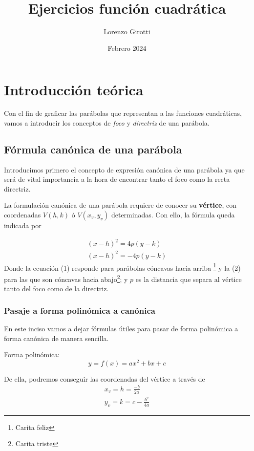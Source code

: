\documentclass{article}
\title{Ejercicios función cuadrática}
\author{Lorenzo Girotti }
\date{Febrero 2024}
\begin{document}
\maketitle

\section{Introducción teórica}
Con el fin de graficar las parábolas que representan a las funciones cuadráticas, vamos a introducir los conceptos de \emph{foco} y \emph{directriz} de una parábola.

\subsection{Fórmula canónica de una parábola}

Introducimos primero el concepto de expresión canónica de una parábola ya que será de vital importancia a la hora de encontrar tanto el foco como la recta directriz.

La formulación canónica de una parábola requiere de conocer su \textbf{vértice}, con coordenadas $V(h,k)$ ó $V(x_v,y_v)$ determinadas. Con ello, la fórmula queda indicada por

\begin{gather}
    \label{eq:form-canon}
    (x-h)^2=4p(y-k)\\
    (x-h)^2=-4p(y-k)
\end{gather}
Donde la ecuación (1) responde para parábolas cóncavas hacia arriba \footnote{Carita feliz} y la (2) para las que son cóncavas hacia abajo\footnote{Carita triste}; y $p$ es la distancia que separa al vértice tanto del foco como de la directriz.

\subsubsection{Pasaje a forma polinómica a canónica}

En este inciso vamos a dejar fórmulas útiles para pasar de forma polinómica a forma canónica de manera sencilla.

Forma polinómica:
\begin{equation}
    \label{eq:polinom}
    y=f(x)=ax^2+bx+c
\end{equation}

De ella, podremos conseguir las coordenadas del vértice a través de
\begin{gather}
    \label{eq:vertice}
    x_v=h=\frac{-b}{2a}\\
    y_v=k=c-\frac{b^2}{4a}
\end{gather}
\end{document}
